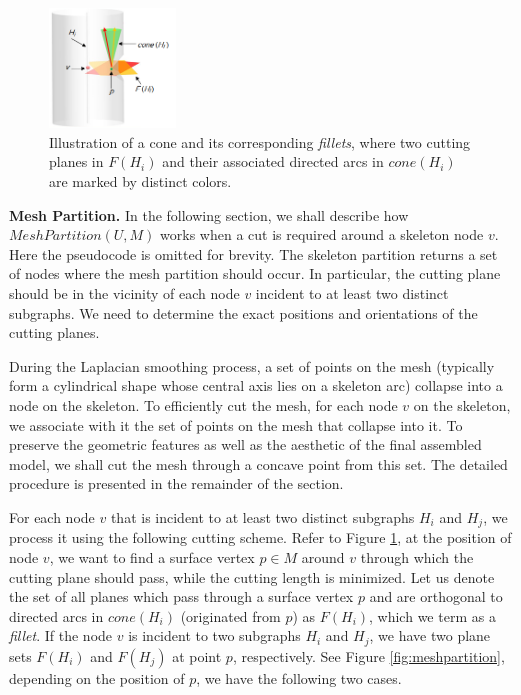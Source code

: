 \begin{figure}[b]
  \centering
  \includegraphics[width=0.3\textwidth]{figs/cone-fillet.png}
  \caption{\label{fig:fillets}%
           Illustration of a cone and its corresponding \emph{fillets}, where two cutting planes in $F(H_i)$ and their associated directed arcs in $cone(H_i)$ are marked by distinct colors.}
\end{figure}


\textbf{Mesh Partition.}
{{In the following section, we shall describe how $MeshPartition(U , M)$ works when a cut is required around a skeleton node $v$. Here the pseudocode is omitted for brevity.}}
The skeleton partition returns a set of nodes where the mesh partition should occur. In particular, the cutting plane should be in the vicinity of each node $v$ incident to at least two distinct subgraphs. We need to determine the exact positions and orientations of the cutting planes. 

{\color{blue}During the Laplacian smoothing process, a set of points on the mesh (typically form a cylindrical shape whose central axis lies on a skeleton arc) collapse into a node on the skeleton. To efficiently cut the mesh, for each node $v$ on the skeleton, we associate with it the set of points on the mesh that collapse into it. To preserve the geometric features as well as the aesthetic of the final assembled model, we shall cut the mesh through a concave point from this set. The detailed procedure is presented in the remainder of the section.}

For each node $v$ that is incident to at least two distinct subgraphs $H_i$ and $H_j$, we process it using the following cutting scheme.
Refer to Figure \ref{fig:fillets}, at the position of node $v$, we want to find a surface vertex $p \in M$ around $v$ through which the cutting plane should pass, while the cutting length is minimized. Let us denote the set of all planes which pass through a surface vertex $p$ and are orthogonal to directed arcs in $cone(H_i)$ (originated from $p$) as $F(H_i)$, which we term as a \emph{fillet}. If the node $v$ is incident to two subgraphs $H_i$ and $H_j$, we have two plane sets $F(H_i)$ and $F(H_j)$ at point $p$, respectively. {\color{blue} See Figure \ref{fig:meshpartition}, depending on the position of $p$, we have the following two cases.}

